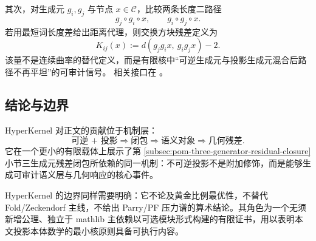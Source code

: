 \documentclass[../../main.tex]{subfiles}
\begin{document}
其次，对生成元 \(g_i,g_j\) 与节点 \(x\in\mathcal C\)，比较两条长度二路径
\[
g_j\circ g_i\circ x,
\qquad
g_i\circ g_j\circ x.
\]
若用最短词长度差给出距离代理，则交换方块残差定义为
\[
K_{ij}(x)
:=
d(g_jg_i x,\ g_i g_j x)-2.
\]
该量不是连续曲率的替代定义，而是有限核中“可逆生成元与投影生成元混合后路径不再平坦”的可审计信号。
相关接口在 。

\subsection{结论与边界}\label{subsec:hyperkernel-conclusion}

HyperKernel 对正文的贡献位于机制层：
\[
\text{可逆 + 投影}
\Longrightarrow
\text{闭包}
\Longrightarrow
\text{语义对象}
\Longrightarrow
\text{几何残差}.
\]
它在一个更小的有限载体上展示了第 \ref{subsec:pom-three-generator-residual-closure} 小节三生成元残差闭包所依赖的同一机制：不可逆投影不是附加修饰，而是能够生成可审计语义层与几何响应的核心事件。

HyperKernel 的边界同样需要明确：它不论及黄金比例最优性，不替代 Fold/Zeckendorf 主线，不给出 Parry/PF 压力谱的算术结论。其角色为一个无须新增公理、独立于 mathlib 主依赖以可选模块形式构建的有限证书，用以表明本文投影本体数学的最小核原则具备可执行内容。


\end{document}
